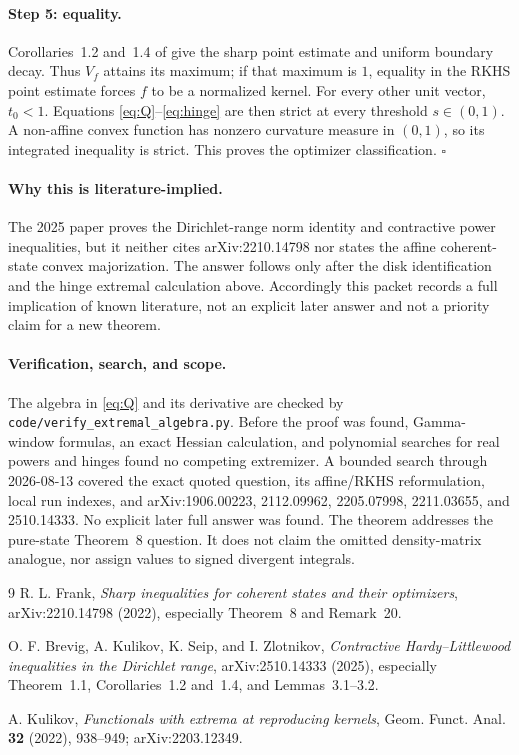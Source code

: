 \documentclass[11pt]{article}
\begin{document}
\paragraph{Step 5: equality.}
Corollaries~1.2 and~1.4 of \cite{BKSZ} give the sharp point estimate and
uniform boundary decay.  Thus $V_f$ attains its maximum; if that maximum is
$1$, equality in the RKHS point estimate forces $f$ to be a normalized kernel.
For every other unit vector, $t_0<1$.  Equations \eqref{eq:Q}--\eqref{eq:hinge}
are then strict at every threshold $s\in(0,1)$.  A non-affine convex function
has nonzero curvature measure in $(0,1)$, so its integrated inequality is
strict.  This proves the optimizer classification.
\hfill$\square$

\paragraph{Why this is literature-implied.}
The 2025 paper proves the Dirichlet-range norm identity and contractive power
inequalities, but it neither cites arXiv:2210.14798 nor states the affine
coherent-state convex majorization.  The answer follows only after the disk
identification and the hinge extremal calculation above.  Accordingly this
packet records a full implication of known literature, not an explicit later
answer and not a priority claim for a new theorem.

\paragraph{Verification, search, and scope.}
The algebra in \eqref{eq:Q} and its derivative are checked by
\texttt{code/verify\_extremal\_algebra.py}.  Before the proof was found,
Gamma-window formulas, an exact Hessian calculation, and polynomial searches
for real powers and hinges found no competing extremizer.  A bounded search
through 2026-08-13 covered the exact quoted question, its affine/RKHS
reformulation, local run indexes, and arXiv:1906.00223, 2112.09962,
2205.07998, 2211.03655, and 2510.14333.  No explicit later full answer was
found.  The theorem addresses the pure-state Theorem~8 question.  It does not
claim the omitted density-matrix analogue, nor assign values to signed
divergent integrals.

\begin{thebibliography}{9}
R. L. Frank,
\emph{Sharp inequalities for coherent states and their optimizers},
arXiv:2210.14798 (2022), especially Theorem~8 and Remark~20.

O. F. Brevig, A. Kulikov, K. Seip, and I. Zlotnikov,
\emph{Contractive Hardy--Littlewood inequalities in the Dirichlet range},
arXiv:2510.14333 (2025), especially Theorem~1.1, Corollaries~1.2 and~1.4,
and Lemmas~3.1--3.2.

A. Kulikov,
\emph{Functionals with extrema at reproducing kernels},
Geom. Funct. Anal. \textbf{32} (2022), 938--949; arXiv:2203.12349.
\end{thebibliography}
\end{document}
